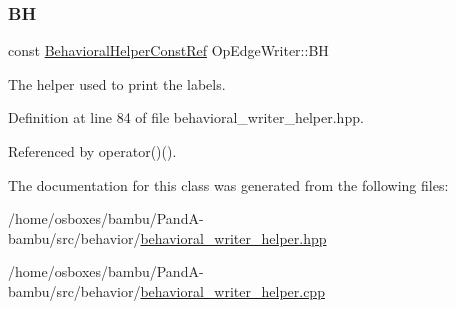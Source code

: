 \subsubsection{\texorpdfstring{BH}{BH}}
{\footnotesize\ttfamily const \hyperlink{behavioral__helper_8hpp_aae973b54cac87eef3b27442aa3e1e425}{Behavioral\+Helper\+Const\+Ref} Op\+Edge\+Writer\+::\+BH\hspace{0.3cm}{\ttfamily [private]}}



The helper used to print the labels. 



Definition at line 84 of file behavioral\+\_\+writer\+\_\+helper.\+hpp.



Referenced by operator()().



The documentation for this class was generated from the following files\+:\begin{DoxyCompactItemize}
\item 
/home/osboxes/bambu/\+Pand\+A-\/bambu/src/behavior/\hyperlink{behavioral__writer__helper_8hpp}{behavioral\+\_\+writer\+\_\+helper.\+hpp}\item 
/home/osboxes/bambu/\+Pand\+A-\/bambu/src/behavior/\hyperlink{behavioral__writer__helper_8cpp}{behavioral\+\_\+writer\+\_\+helper.\+cpp}\end{DoxyCompactItemize}

